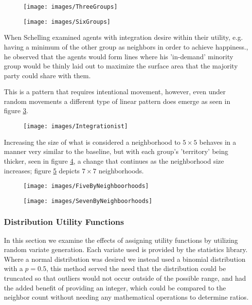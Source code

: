 \documentclass[sigplan,nonacm]{acmart}
\begin{document}
\begin{figure}
	\centering
	\texttt{[image: images/ThreeGroups]}
	\caption{}
	\label{fig:threegroups}
\end{figure}
\begin{figure}
	\centering
	\texttt{[image: images/SixGroups]}
	\caption{}
	\label{fig:sixgroups}
\end{figure}

When Schelling examined agents with integration desire within their utility, 
e.g. having a minimum of the other group as neighbors in order to achieve happiness.,
he observed that the agents would form lines where his 'in-demand' minority group would be thinly laid out to maximize the 
surface area that the majority party could share with them.

This is a pattern that requires intentional movement, however, 
even under random movements a different type of linear pattern does emerge as seen in figure \ref{fig:integrationist}.

\begin{figure}
	\centering
	\texttt{[image: images/Integrationist]}
	\caption{}
	\label{fig:integrationist}
\end{figure}

Increasing the size of what is considered a neighborhood to \(5\times5\) behaves in a manner very similar to the baseline,
but with each group's 'territory' being thicker, seen in figure \ref{fig:fivebyneighboorhoods}, a change that continues
as the neighborhood size increases; figure \ref{fig:sevenbyneighboorhoods} depicts \(7\times7\) neighborhoods.

\begin{figure}
	\centering
	\texttt{[image: images/FiveByNeighboorhoods]}
	\caption{}
	\label{fig:fivebyneighboorhoods}
\end{figure}
\begin{figure}
	\centering
	\texttt{[image: images/SevenByNeighboorhoods]}
	\caption{}
	\label{fig:sevenbyneighboorhoods}
\end{figure}

\subsubsection{Distribution Utility Functions}

In this section we examine the effects of assigning utility functions by utilizing random variate generation.
Each variate used is provided by the  statistics library.
Where a normal distribution was desired we instead used a binomial distribution with a \(p=0.5\),
this method served the need that the distribution could be truncated so that outliers would not occur
outside of the possible range, and had the added benefit of providing an integer, which could be compared 
to the neighbor count without needing any mathematical operations to determine ratios.
\end{document}
